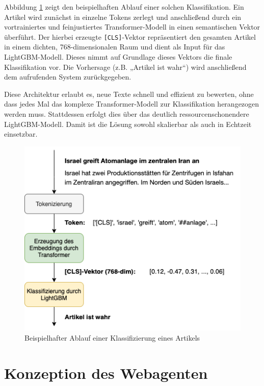 Abbildung \ref{fig:beispielablauf_gesamt} zeigt den beispielhaften Ablauf einer solchen Klassifikation. 
Ein Artikel wird zunächst in einzelne Tokens zerlegt und anschließend durch ein vortrainiertes und feinjustiertes Transformer-Modell in einen semantischen Vektor überführt. 
Der hierbei erzeugte \texttt{[CLS]}-Vektor repräsentiert den gesamten Artikel in einem dichten, 768-dimensionalen Raum und dient als Input für das LightGBM-Modell.
Dieses nimmt auf Grundlage dieses Vektors die finale Klassifikation vor. Die Vorhersage (z.B. „Artikel ist wahr“) wird anschließend dem aufrufenden System zurückgegeben.

Diese Architektur erlaubt es, neue Texte schnell und effizient zu bewerten, ohne dass jedes Mal das komplexe Transformer-Modell zur Klassifikation herangezogen werden muss. 
Stattdessen erfolgt dies über das deutlich ressourcenschonendere LightGBM-Modell. Damit ist die Lösung sowohl skalierbar als auch in Echtzeit einsetzbar.

\begin{figure}[htbp]
    \begin{center}
        \includegraphics[scale=0.6]{diagrams/beispielablauf_gesamt.png}
        \caption{\label{fig:beispielablauf_gesamt} Beispielhafter Ablauf einer Klassifizierung eines Artikels}
    \end{center}
\end{figure}

\section{Konzeption des Webagenten} \label{sec:06:hauptkomponente}

